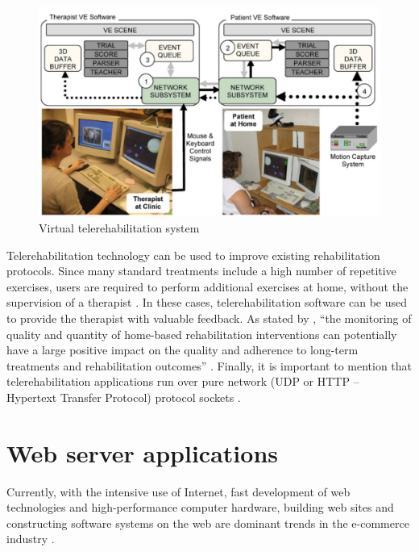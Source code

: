 \begin{figure}[!hbt]
\begin{center}
\includegraphics[width=1 \textwidth]{img/cap2/holden2007}
\caption{Virtual telerehabilitation system \cite{holden2007}}
\label{fig:holden2007}
\end{center}
\end{figure}

Telerehabilitation technology can be used to improve existing rehabilitation protocols. Since many standard treatments include a high number of repetitive exercises, users are required to perform additional exercises at home, without the supervision of a therapist \cite{ortiz2014}. In these cases, telerehabilitation software can be used to provide the therapist with valuable feedback. As stated by \cite{ortiz2014}, ``the monitoring of quality and quantity of home-based rehabilitation interventions can potentially have a large positive impact on the quality and adherence to long-term treatments and rehabilitation outcomes'' \cite{pons2014}. Finally, it is important to mention that telerehabilitation applications run over pure network (UDP or HTTP -- Hypertext Transfer Protocol) protocol sockets \cite{leung2007}.

\section{Web server applications}
\label{sec:websapp}

Currently, with the intensive use of Internet, fast development of web technologies and high-performance computer hardware, building web sites and constructing software systems on the web are dominant trends in the e-commerce industry \cite{attitalla2016, zambonelli2016,laine2011,stroulia2001}. 

